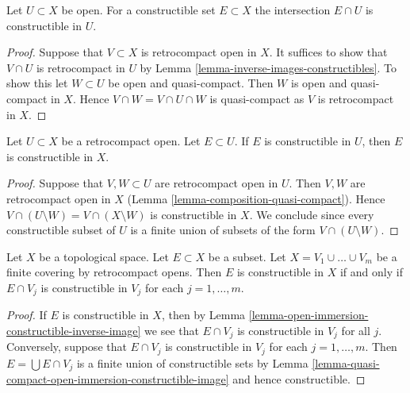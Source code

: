 \begin{lemma}
\label{lemma-open-immersion-constructible-inverse-image}
Let $U \subset X$ be open. For a constructible set
$E \subset X$ the intersection $E \cap U$ is constructible
in $U$.
\end{lemma}

\begin{proof}
Suppose that $V \subset X$ is retrocompact open in $X$.
It suffices to show that $V \cap U$ is retrocompact in $U$
by Lemma \ref{lemma-inverse-images-constructibles}. To show this
let $W \subset U$ be open and quasi-compact. Then $W$
is open and quasi-compact in $X$. Hence $V \cap W = V \cap U \cap W$
is quasi-compact as $V$ is retrocompact in $X$.
\end{proof}

\begin{lemma}
\label{lemma-quasi-compact-open-immersion-constructible-image}
Let $U \subset X$ be a retrocompact open. Let $E \subset U$.
If $E$ is constructible in $U$, then $E$ is constructible in $X$.
\end{lemma}

\begin{proof}
Suppose that $V, W \subset U$ are retrocompact open in $U$.
Then $V, W$ are retrocompact open in $X$
(Lemma \ref{lemma-composition-quasi-compact}).
Hence $V \cap (U \setminus W) = V \cap (X \setminus W)$
is constructible in $X$. We conclude since every constructible subset of $U$
is a finite union of subsets of the form $V \cap (U \setminus W)$.
\end{proof}

\begin{lemma}
\label{lemma-collate-constructible}
Let $X$ be a topological space. Let $E \subset X$ be a subset.
Let $X = V_1 \cup \ldots \cup V_m$ be a finite covering by
retrocompact opens.
Then $E$ is constructible in $X$ if and only if $E \cap V_j$
is constructible in $V_j$ for each $j = 1, \ldots, m$.
\end{lemma}

\begin{proof}
If $E$ is constructible in $X$, then by
Lemma \ref{lemma-open-immersion-constructible-inverse-image}
we see that $E \cap V_j$ is constructible in $V_j$ for all $j$.
Conversely, suppose that $E \cap V_j$
is constructible in $V_j$ for each $j = 1, \ldots, m$.
Then $E = \bigcup E \cap V_j$ is a finite union of
constructible sets by
Lemma \ref{lemma-quasi-compact-open-immersion-constructible-image}
and hence constructible.
\end{proof}

